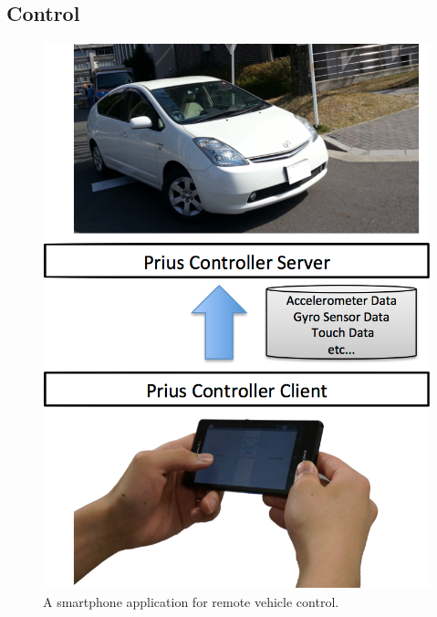 \subsection{Control}
\label{sec:control}

\begin{figure}[!t]
 \centering
 \includegraphics[width=0.75\hsize]{fig/Andrive.pdf}
 \caption{A smartphone application for remote vehicle control.}
 \label{fig:andrive}
\end{figure}

